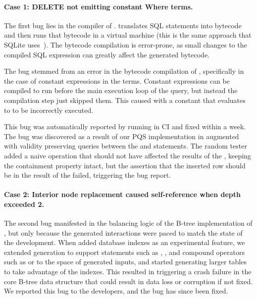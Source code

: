 \paragraph{Case 1: DELETE not emitting constant Where terms.}

The first bug lies in the compiler of \db{}. \db{} translates SQL statements into
bytecode and then runs that bytecode in a virtual machine (this is the same approach
that SQLite uses~\cite{sqlite}). The bytecode compilation is error-prone, as small
changes to the compiled SQL expression can greatly affect the generated bytecode.

The bug stemmed from an error in the bytecode compilation of , specifically
in the case of constant expressions in the  terms. Constant expressions can
be compiled to run before the main execution loop of the query, but instead the
compilation step just skipped them. This caused  with a constant that
evaluates to  to be incorrectly executed.

This bug was automatically reported by \tool{} running in \db{} CI and fixed within a
week. The bug was discovered as a result of our PQS implementation in \db{} augmented
with validity preserving queries between the  and  statements.
The random tester added a naive  operation that should not have affected
the results of the , keeping the containment property intact, but the
assertion that the inserted row should be in the result of the  failed,
triggering the bug report.

\paragraph{Case 2: Interior node replacement caused self-reference when depth exceeded 2.}

The second bug manifested in the balancing logic of the B-tree implementation of \db{},
but only because the generated interactions were paced to match the state of the \db{}
development. When \db{} added database indexes as an experimental feature, we extended
generation to support statements such as , , and
compound operators such as  or  to the space of generated
inputs, and started generating larger tables to take advantage of the indexes. This
resulted in triggering a crash failure in the core B-tree data structure that could
result in data loss or corruption if not fixed. We reported this bug to the \db{}
developers, and the bug has since been fixed.

